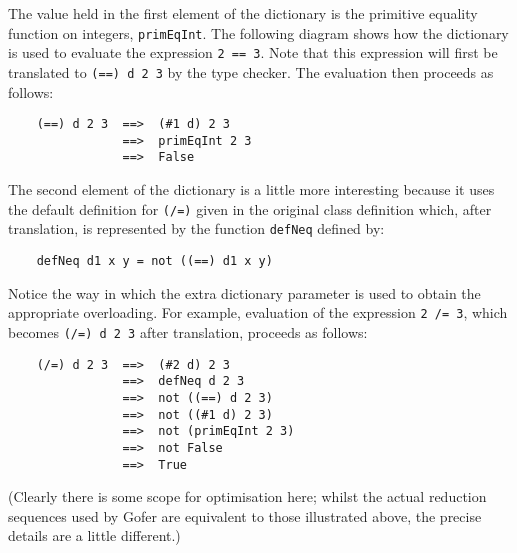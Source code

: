 The value held in the first element of the dictionary is the  primitive
equality function on  integers,  \verb"primEqInt".   The  following  diagram
shows how the dictionary is used to evaluate the expression \verb"2 == 3".
Note that this expression will first be translated to  \verb"(==) d 2 3"  by
the type checker.  The evaluation then proceeds as follows:
\begin{verbatim}
    (==) d 2 3  ==>  (#1 d) 2 3
                ==>  primEqInt 2 3
                ==>  False
\end{verbatim}
The second element of the  dictionary  is  a  little  more  interesting
because it uses the default definition for \verb"(/=)" given in  the  original
class definition  which,  after  translation,  is  represented  by  the
function \verb"defNeq" defined by:
\begin{verbatim}
    defNeq d1 x y = not ((==) d1 x y)
\end{verbatim}
Notice the way in which the  extra  dictionary  parameter  is  used  to
obtain the appropriate overloading.  For  example,  evaluation  of  the
expression  \verb"2 /= 3", which  becomes  \verb"(/=) d 2 3"  
after  translation,
proceeds as follows:
\begin{verbatim}
    (/=) d 2 3  ==>  (#2 d) 2 3
                ==>  defNeq d 2 3
                ==>  not ((==) d 2 3)
                ==>  not ((#1 d) 2 3)
                ==>  not (primEqInt 2 3)
                ==>  not False
                ==>  True
\end{verbatim}
(Clearly there is some scope for optimisation here; whilst  the  actual
reduction sequences used by Gofer are equivalent to  those  illustrated
above, the precise details are a little different.)

